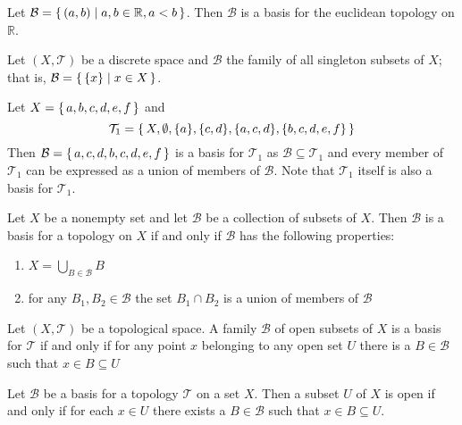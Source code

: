 \begin{exmp}
    Let \(\mathcal{B} = \left\{\, (a, b) \mathrel{\mid} a, b \in \mathbb{R}, a < b \,\right\}\). Then \(\mathcal{B}\) is a basis for the euclidean topology on \(\mathbb{R}\).
\end{exmp}

\begin{exmp}
    Let \((X, \mathcal{T})\) be a discrete space and \(\mathcal{B}\) the family of all singleton subsets of \(X\); that is, \(\mathcal{B} = \left\{\, \{x\} \mathrel{\mid} x \in X \,\right\}\).
\end{exmp}

\begin{exmp}
    Let \(X = \left\{\, a, b, c, d, e, f \,\right\}\) and
    \begin{equation}
        \mathcal{T}_1 = \left\{\, X, \emptyset, \{a\}, \{c, d\}, \{a, c, d\}, \{b, c, d, e, f\} \,\right\}
    \end{equation}
    Then \(\mathcal{B} = \left\{\, {a}, {c, d}, {b, c, d, e, f} \,\right\}\) is a basis for \(\mathcal{T}_1\) as \(\mathcal{B} \subseteq \mathcal{T}_1\) and every member of \(\mathcal{T}_1\) can be expressed as a union of members of \(\mathcal{B}\). Note that \(\mathcal{T}_1\) itself is also a basis for \(\mathcal{T}_1\).
\end{exmp}

\begin{prps}
    Let \(X\) be a nonempty set and let \(\mathcal{B}\) be a collection of subsets of \(X\). Then \(\mathcal{B}\) is a basis for a topology on \(X\) if and only if \(\mathcal{B}\) has the following properties:
    \begin{enumerate}
        \item \(X = \bigcup_{B \in \mathcal{B}} B\)
        \item for any \(B_1, B_2 \in \mathcal{B}\) the set \(B_1 \cap B_2\) is a union of members of \(\mathcal{B}\)
    \end{enumerate}
\end{prps}

\begin{prps}
    Let \((X, \mathcal{T})\) be a topological space. A family \(\mathcal{B}\) of open subsets of \(X\) is a basis for \(\mathcal{T}\) if and only if for any point \(x\) belonging to any open set \(U\) there is a \(B \in \mathcal{B}\) such that \(x \in B \subseteq U\)
\end{prps}

\begin{prps}
    Let \(\mathcal{B}\) be a basis for a topology \(\mathcal{T}\) on a set \(X\). Then a subset \(U\) of \(X\) is open if and only if for each \(x \in U\) there exists a \(B \in \mathcal{B}\) such that \(x \in B \subseteq U\).
\end{prps}

